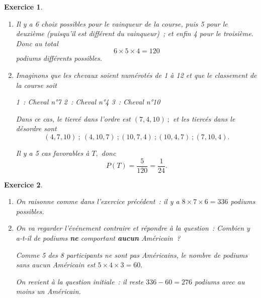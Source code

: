 \documentclass[10pt]{article}
\newtheorem{exo}{Exercice}
\begin{document}
\begin{exo}



\begin{enumerate}
\item Il y a 6 choix possibles pour le vainqueur de la course, puis 5 pour le deuxième (puisqu'il est différent du vainqueur)~; et enfin 4 pour le troisième. Donc au total
\[6\times 5\times 4=120\] podiums différents possibles.
\item Imaginons que les chevaux soient numérotés de 1 à 12 et que le classement de la course soit \begin{center} 1~: Cheval n°7 \hspace*{1cm} 2~: Cheval n°4 \hspace*{1cm} 3~: Cheval n°10\end{center}

Dans ce cas, le tiercé dans l'ordre est $(7,4,10)~;$ et les tiercés dans le désordre sont
\[(4,7,10)~;~(4,10,7)~;(10,7,4)~;(10,4,7)~;(7,10,4).\]

Il y a 5 cas favorables à $T,$ donc \[P(T)=\frac{5}{120}=\frac{1}{24}.\]
	
\end{enumerate}

\end{exo}

\begin{exo}



\begin{enumerate}
\item On raisonne comme dans l'exercice précédent~: il y a $8\times 7\times 6=336$ podiums possibles.
\item On va regarder l'événement contraire et répondre à la question~: \og Combien y a-t-il de podiums  \textbf{ne} comportant \textbf{aucun} Américain~? \fg

Comme 5 des 8 participants ne sont pas Américains, le nombre de podiums sans aucun Américain est $5\times 4\times 3=60.$

\medskip

On revient à la question initiale~: il reste $336-60=276$ podiums avec au moins un Américain.
\end{enumerate}

\end{exo}
\end{document}
